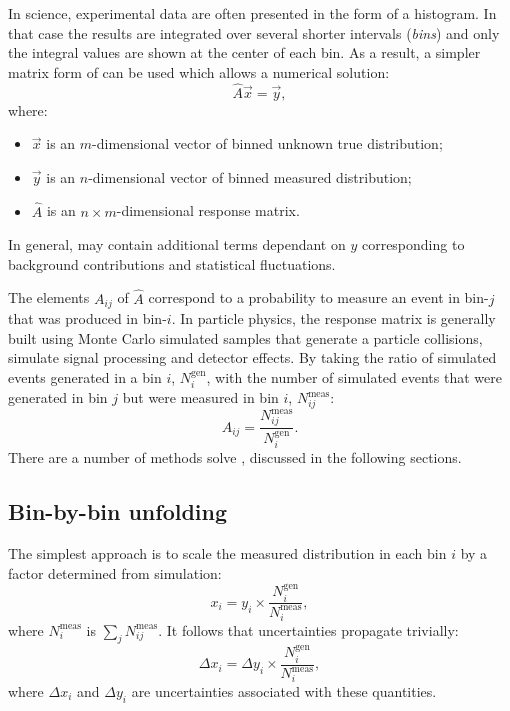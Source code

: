 In science, experimental data are often presented in the form of a histogram. 
In that case the results are integrated over several shorter intervals (\textit{bins}) and only the integral values are shown at the center of each bin.
As a result, a simpler matrix form of  can be used which allows a numerical solution:
\begin{equation}\label{eq:unfolding_linear_equation}
\hat{A}\vec{x}=\vec{y},
\end{equation}
where:
\begin{itemize}
    \item $\vec{x}$ is an $m$-dimensional vector of binned unknown true distribution;
    \item $\vec{y}$ is an $n$-dimensional vector of binned measured distribution;
    \item $\hat{A}$ is an $n\times m$-dimensional response matrix.

\end{itemize}
In general,  may contain additional terms dependant on $y$ corresponding to background contributions and statistical fluctuations.

The elements $A_{ij}$ of $\hat{A}$ correspond to a probability to measure an event in bin-$j$ that was produced in bin-$i$.
In particle physics, the response matrix is generally built using Monte Carlo simulated samples that generate a particle collisions, simulate signal processing and detector effects.
By taking the ratio of simulated events generated in a bin $i$, $N_i^{\mathrm{gen}}$, with the number of simulated events that were generated in bin $j$ but were measured in bin $i$, $N_{ij}^{\mathrm{meas}}$:
\begin{equation}\label{eq:response_matrix_element}
    A_{ij} = \frac{N_{ij}^{\mathrm{meas}}}{N_i^{\mathrm{gen}}}.
\end{equation}
There are a number of methods solve , discussed in the following sections.

\subsection{Bin-by-bin unfolding}

The simplest approach is to scale the measured distribution in each bin $i$ by a factor determined from simulation:
\begin{equation}\label{eq:bin_by_bin_unfolding}
 x_i = y_i \times \frac{N_i^{\mathrm{gen}}}{N_i^{\mathrm{meas}}},
\end{equation}
where $N_i^{\mathrm{meas}}$ is $\sum_j N_{ij}^{\mathrm{meas}}$.
It follows that uncertainties propagate trivially:
\begin{equation}\label{eq:bin_by_bin_unfolding_error}
    \Delta x_i = \Delta y_i \times \frac{N_i^{\mathrm{gen}}}{N_i^{\mathrm{meas}}},
\end{equation}
where $\Delta x_i$ and $\Delta y_i$ are uncertainties associated with these quantities.


